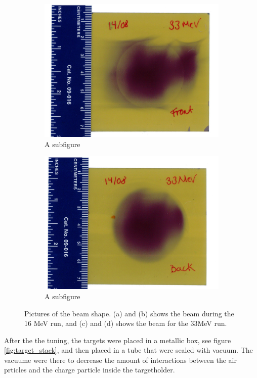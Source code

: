 \documentclass[twoside,english]{uiofysmaster/uiofysmaster}
\begin{document}
\begin{figure} [H]
\begin{subfigure}{.5\textwidth}
  \includegraphics[width=1\linewidth]{33MeV_front.jpeg}
  \caption{A subfigure}
  \label{fig:sub3}
\end{subfigure}%
\begin{subfigure}{.5\textwidth}
  \centering
  \includegraphics[width=1\linewidth]{33MeV_back.jpeg}
  \caption{A subfigure}
  \label{fig:sub4}
\end{subfigure}
\caption{Pictures of the beam shape. (a) and (b) shows the beam during the 16 MeV run, and (c) and (d) shows the beam for the 33MeV run.}
\label{fig:test}
\end{figure}
\noindent
After the the tuning, the targets were placed in a metallic box, see figure \ref{fig:target_stack}, and then placed in a tube that were sealed with vacuum. The vacuume were there to decrease the amount of interactions between the air prticles and the charge particle inside the targetholder. 
\end{document}
